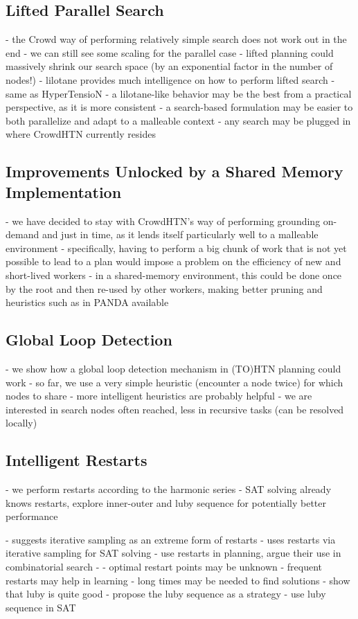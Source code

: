 \subsection{Lifted Parallel Search}
- the Crowd way of performing relatively simple search does not work out in the end
- we can still see some scaling for the parallel case
- lifted planning could massively shrink our search space (by an exponential factor in the number of nodes!)
- lilotane provides much intelligence on how to perform lifted search
- same as HyperTensioN
- a lilotane-like behavior may be the best from a practical perspective, as it is more consistent
- a search-based formulation may be easier to both parallelize and adapt to a malleable context - any search may be plugged in where CrowdHTN currently resides

\subsection{Improvements Unlocked by a Shared Memory Implementation}
- we have decided to stay with CrowdHTN's way of performing grounding on-demand and just in time, as it lends itself particularly well to a malleable environment
- specifically, having to perform a big chunk of work that is not yet possible to lead to a plan would impose a problem on the efficiency of new and short-lived workers
- in a shared-memory environment, this could be done once by the root and then re-used by other workers, making better pruning and heuristics such as in PANDA available

\subsection{Global Loop Detection}
- we show how a global loop detection mechanism in (TO)HTN planning could work
- so far, we use a very simple heuristic (encounter a node twice) for which nodes to share
- more intelligent heuristics are probably helpful
- we are interested in search nodes often reached, less in recursive tasks (can be resolved locally)

\subsection{Intelligent Restarts}
- we perform restarts according to the harmonic series
- SAT solving already knows restarts, explore inner-outer and luby sequence for potentially better performance

- \cite{langley1992systematic} suggests iterative sampling as an extreme form of restarts
- \cite{crawford1994experimental} uses restarts via iterative sampling for SAT solving
- \cite{gomes1998boosting} use restarts in planning, argue their use in combinatorial search
- \cite{biere2015evaluating}
	- optimal restart points may be unknown
	- frequent restarts may help in learning
	- long times may be needed to find solutions
	- show that luby is quite good
- \cite{luby1993optimal} propose the luby sequence as a strategy
- \cite{huang2007effect} use luby sequence in SAT